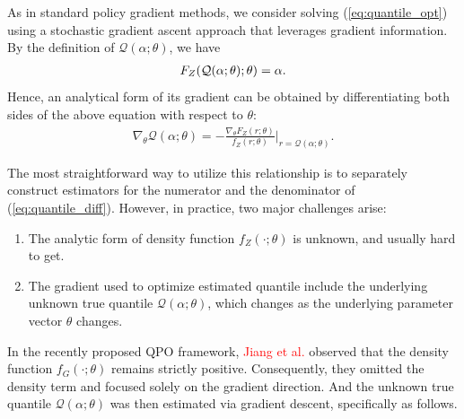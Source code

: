 As in standard policy gradient methods, we consider solving (\ref{eq:quantile_opt}) using a stochastic gradient ascent approach that leverages gradient information. By the definition of $\mathcal{Q}(\alpha;\theta)$, we have
\begin{align} \notag
    F_Z(\mathcal{Q}(\alpha;\theta); \theta) = \alpha.
\end{align}
Hence, an analytical form of its gradient can be obtained by differentiating both sides of the above equation with respect to $\theta$:
\begin{align}
    \nabla_\theta \mathcal{Q}(\alpha;\theta)
    = -\frac{\nabla_\theta F_Z(r;\theta)}{f_Z(r;\theta)}\bigg|_{r = \mathcal{Q}(\alpha;\theta)}.
    \label{eq:quantile_diff}
\end{align}

The most straightforward way to utilize this relationship is to separately construct estimators for the numerator and the denominator of (\ref{eq:quantile_diff}). However, in practice, two major challenges arise:
\begin{enumerate}
    \item The analytic form of density function $f_{Z}(\cdot;\theta)$ is unknown, and usually hard to get.
    \item The gradient used to optimize estimated quantile include the underlying unknown true quantile $\mathcal{Q}(\alpha;\theta)$, which changes as the underlying parameter vector $\theta$ changes.
\end{enumerate}

In the recently proposed QPO framework, \textcolor{red}{Jiang et al.} observed that the density function $f_{G}(\cdot;\theta)$ remains strictly positive. Consequently, they omitted the density term and focused solely on the gradient direction. And the unknown true quantile $\mathcal{Q}(\alpha;\theta)$ was then estimated via gradient descent, specifically as follows.


